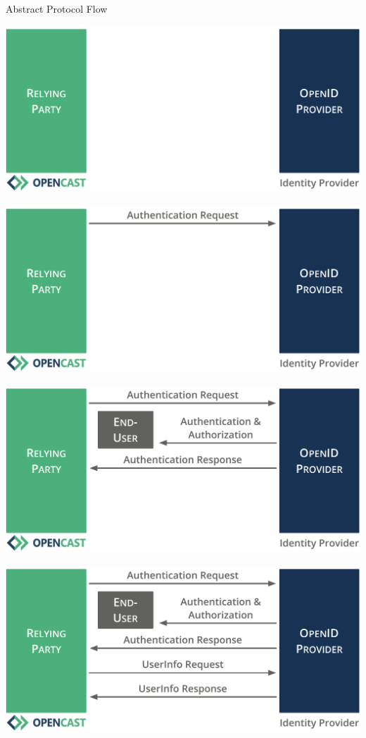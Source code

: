 \documentclass[aspectratio=169]{beamer}
\begin{document}
\begin{frame}{Abstract Protocol Flow}
	\vspace*{0.5em}
	\begin{overprint}
		\centerline{\includegraphics[height=0.83\textheight]{figures/abstract-protocol-flow-1}}
		\centerline{\includegraphics[height=0.83\textheight]{figures/abstract-protocol-flow-2}}
		\centerline{\includegraphics[height=0.83\textheight]{figures/abstract-protocol-flow-3}}
		\centerline{\includegraphics[height=0.83\textheight]{figures/abstract-protocol-flow-4}}
	\end{overprint}
	\vspace*{-1.8em}
\end{frame}
\end{document}

